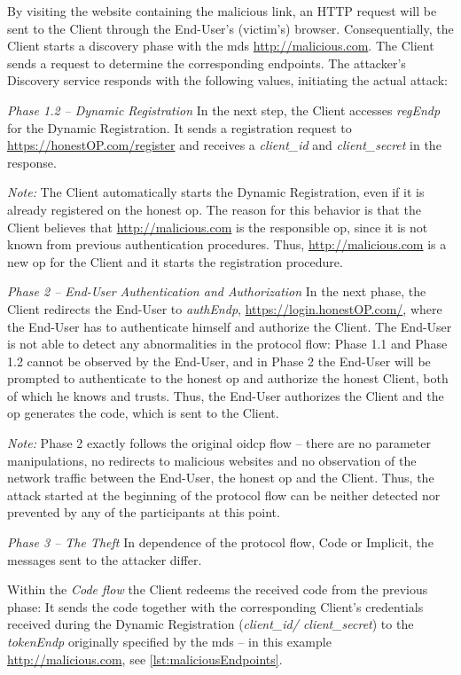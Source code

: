 \documentclass[conference,compsoc]{IEEEtran}
\begin{document}
By visiting the website containing the malicious link, an HTTP request will be sent to the Client through the End-User's (victim's) browser.
Consequentially, the Client starts a discovery phase with the \gls{mds} \url{http://malicious.com}.
The Client sends a request to determine the corresponding endpoints.
The attacker's Discovery service responds with the following values, initiating the actual attack:



\emph{Phase 1.2 -- Dynamic Registration}
In the next step, the Client accesses \emph{regEndp} for the Dynamic Registration.
It sends a registration request to \url{https://honestOP.com/register} and receives a \emph{client\_id} and \emph{client\_secret} in the response.


\emph{Note:} The Client automatically starts the Dynamic Registration, even if it is already registered on the honest \gls{op}.
The reason for this behavior is that the Client believes that \url{http://malicious.com} is the responsible \gls{op}, since it is not known from previous authentication procedures.
Thus, \url{http://malicious.com} is a new \gls{op} for the Client and it starts the registration procedure.

\emph{Phase 2 -- End-User Authentication and Authorization}
In the next phase, the Client redirects the End-User to \emph{authEndp}, \url{https://login.honestOP.com/}, where the End-User has to authenticate himself and authorize the Client.
The End-User is not able to detect any abnormalities in the protocol flow:
Phase 1.1 and Phase 1.2 cannot be observed by the End-User, and in Phase 2 the End-User will be prompted to authenticate to the honest \gls{op} and authorize the honest Client, both of which he knows and trusts.
Thus, the End-User authorizes the Client and the \gls{op} generates the \gls{code}, which is sent to the Client.

\emph{Note:} Phase 2 exactly follows the original \gls{oidcp} flow -- there are no parameter manipulations, no redirects to malicious websites and no observation of the network traffic between the End-User, the honest \gls{op} and the Client.
Thus, the attack started at the beginning of the protocol flow can be neither detected nor prevented by any of the participants at this point.


\emph{Phase 3 -- The Theft}
In dependence of the protocol flow, Code or Implicit, the messages sent to the attacker differ.

Within the \emph{Code flow} the Client redeems the received \gls{code} from the previous phase: It sends the \gls{code} together with the corresponding Client's credentials received during the Dynamic Registration (\emph{client\_id/ client\_secret}) to the \emph{tokenEndp} originally specified by the \gls{mds} -- in this example \url{http://malicious.com}, see \autoref{lst:maliciousEndpoints}.
\end{document}
